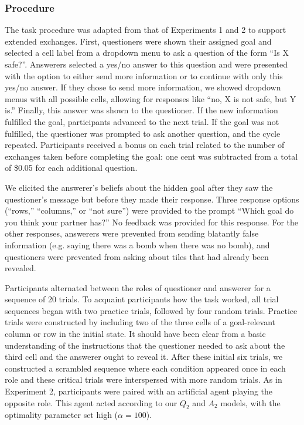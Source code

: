\documentclass[11pt, floatsintext]{apa6}
\begin{document}
\subsubsection{Procedure}

The task procedure was adapted from that of Experiments 1 and 2 to support extended exchanges. 
First, questioners were shown their assigned goal and selected a cell label from a dropdown menu to ask a question of the form ``Is X safe?''. 
Answerers selected a yes/no answer to this question and were presented with the option to either send more information or to continue with only this yes/no answer.
If they chose to send more information, we showed dropdown menus with all possible cells, allowing for responses like ``no, X is not safe, but Y is.''
Finally, this answer was shown to the questioner.
If the new information fulfilled the goal, participants advanced to the next trial.
If the goal was not fulfilled, the questioner was prompted to ask another question, and the cycle repeated.
Participants received a bonus on each trial related to the number of exchanges taken before completing the goal: one cent was subtracted from a total of \$0.05 for each additional question.%

We elicited the answerer's beliefs about the hidden goal after they saw the questioner's message but before they made their response.
Three response options (``rows,'' ``columns,'' or ``not sure'') were provided to the prompt ``Which goal do you think your partner has?'' 
No feedback was provided for this response.
For the other responses, answerers were prevented from sending blatantly false information (e.g. saying there was a bomb when there was no bomb), and questioners were prevented from asking about tiles that had already been revealed.

Participants alternated between the roles of questioner and answerer for a sequence of 20 trials. 
To acquaint participants how the task worked, all trial sequences began with two practice trials, followed by four random trials.
Practice trials were constructed by including two of the three cells of a goal-relevant column or row in the initial state. 
It should have been clear from a basic understanding of the instructions that the questioner needed to ask about the third cell and the answerer ought to reveal it. 
After these initial six trials, we constructed a scrambled sequence where each condition appeared once in each role and these critical trials were interspersed with more random trials.
As in Experiment 2, participants were paired with an artificial agent playing the opposite role. 
This agent acted according to our $Q_2$ and $A_2$ models, with the optimality parameter set high ($\alpha = 100$). 
\end{document}
